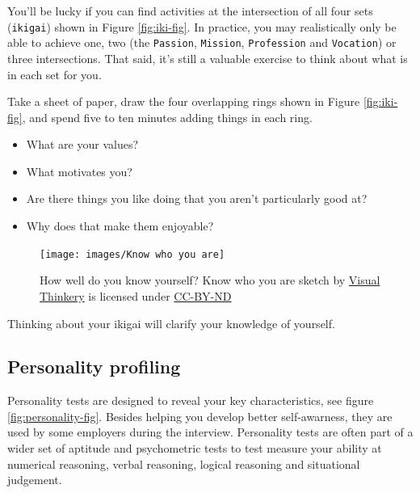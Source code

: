 \documentclass[
]{book}
\providecommand{\tightlist}{%
  \setlength{\itemsep}{0pt}\setlength{\parskip}{0pt}}
\begin{document}
You'll be lucky if you can find activities at the intersection of all four sets (\texttt{ikigai}) shown in Figure \ref{fig:iki-fig}. In practice, you may realistically only be able to achieve one, two (the \texttt{Passion}, \texttt{Mission}, \texttt{Profession} and \texttt{Vocation}) or three intersections. That said, it's still a valuable exercise to think about what is in each set for you.

Take a sheet of paper, draw the four overlapping rings shown in Figure \ref{fig:iki-fig}, and spend five to ten minutes adding things in each ring.

\begin{itemize}
\tightlist
\item
  What are your values?
\item
  What motivates you?
\item
  Are there things you like doing that you aren't particularly good at?
\item
  Why does that make them enjoyable?
\end{itemize}

\begin{figure}

{\centering \texttt{[image: images/Know who you are]} 

}

\caption{How well do you know yourself? Know who you are sketch by \href{https://visualthinkery.com}{Visual Thinkery} is licensed under \href{https://creativecommons.org/licenses/by-nd/4.0/}{CC-BY-ND}}\label{fig:know-fig}
\end{figure}



Thinking about your ikigai will clarify your knowledge of yourself.

\hypertarget{personality}{%
\subsection{Personality profiling}\label{personality}}

Personality tests are designed to reveal your key characteristics, see figure \ref{fig:personality-fig}. Besides helping you develop better self-awarness, they are used by some employers during the interview. Personality tests are often part of a wider set of aptitude and psychometric tests to test measure your ability at numerical reasoning, verbal reasoning, logical reasoning and
situational judgement.
\end{document}
